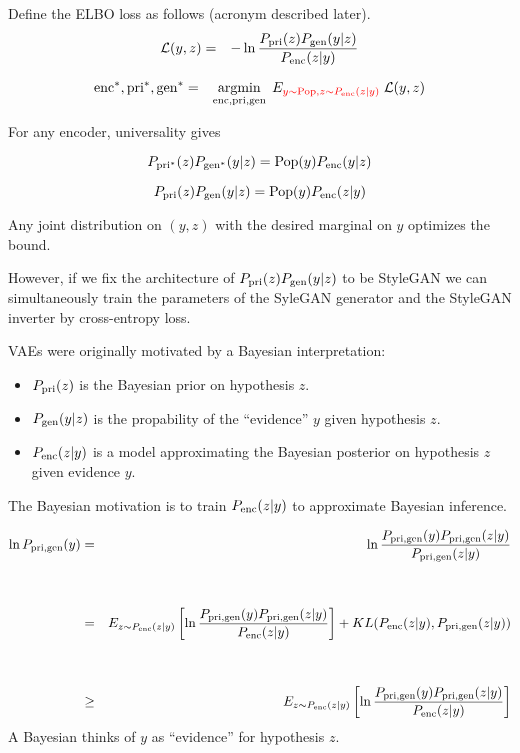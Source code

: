 {Define the ELBO loss as follows (acronym described later).
\begin{eqnarray*}
{\cal L}(y,z) & = & - \ln \frac{P_{\mathrm{pri}}(z)P_{\mathrm{gen}}(y|z)}{P_{\mathrm{enc}}(z|y)}
\end{eqnarray*}

\begin{eqnarray*}
\mathrm{enc}^*,\mathrm{pri}^*,\mathrm{gen}^* & = & \operatorname*{argmin}_{\mathrm{enc},\mathrm{pri},\mathrm{gen}}\;E_{\color{red} y \sim \mathrm{Pop},z\sim P_{\mathrm{enc}}(z|y)}\;{\cal L}(y,z)
\end{eqnarray*}

\vfill
For any encoder, universality gives

{\color{red} $$P_{\mathrm{pri}^*}(z)P_{\mathrm{gen}^*}(y|z) = \mathrm{Pop}(y)P_{\mathrm{enc}}(y|z)$$}


{\color{red} $$P_{\mathrm{pri}}(z)P_{\mathrm{gen}}(y|z) = \mathrm{Pop}(y)P_{\mathrm{enc}}(z|y)$$}

\vfill
Any joint distribution on $(y,z)$ with the desired marginal on $y$ optimizes the bound.

\vfill
However, if we fix the architecture of $P_{\mathrm{pri}}(z)P_{\mathrm{gen}}(y|z)$ to be StyleGAN we can simultaneously train the parameters of the SyleGAN generator
and the StyleGAN inverter by cross-entropy loss.


VAEs were originally motivated by a Bayesian interpretation:

\vfill
\begin{itemize}
\item $P_{\mathrm{pri}}(z)$ is the Bayesian prior on hypothesis $z$.

\vfill
\item $P_{\mathrm{gen}}(y|z)$ is the propability of the ``evidence'' $y$ given hypothesis $z$.

\vfill
\item $P_{\mathrm{enc}}(z|y)$ is a model approximating the Bayesian posterior on hypothesis $z$ given evidence $y$.
\end{itemize}

\vfill
The Bayesian motivation is to train $P_{\mathrm{enc}}(z|y)$ to approximate Bayesian inference.

{\huge
\begin{eqnarray*}
\ln P_{\mathrm{pri},\mathrm{gen}}(y) & =  & \ln \frac{P_{\mathrm{pri},\mathrm{gen}}(y)P_{\mathrm{pri},\mathrm{gen}}(z|y)}{P_{\mathrm{pri},\mathrm{gen}}(z|y)} \\
\\
\\
& = & E_{z \sim P_{\mathrm{enc}}(z|y)}\left[\ln \frac{P_{\mathrm{pri},\mathrm{gen}}(y)P_{\mathrm{pri},\mathrm{gen}}(z|y)}{P_{\mathrm{enc}}(z|y)}\right] + KL(P_{\mathrm{enc}}(z|y),P_{\mathrm{pri},\mathrm{gen}}(z|y)) \\
\\
\\
& \geq & E_{z \sim P_{\mathrm{enc}}(z|y)}\left[\ln \frac{P_{\mathrm{pri},\mathrm{gen}}(y)P_{\mathrm{pri},\mathrm{gen}}(z|y)}{P_{\mathrm{enc}}(z|y)}\right] \\
\end{eqnarray*}
}
A Bayesian thinks of $y$ as ``evidence'' for hypothesis $z$.

}
